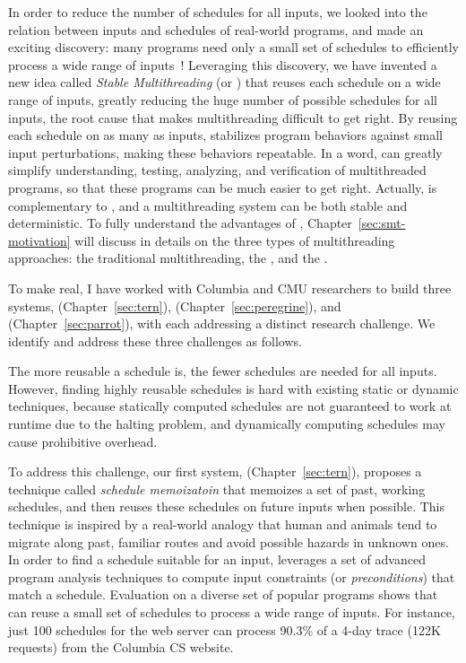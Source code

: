 In order to reduce the number of schedules for all inputs, we looked into the
relation between inputs and schedules of real-world programs, and made an
exciting discovery: many programs need only a small set of schedules to
efficiently process a wide range of inputs~\cite{smt:cacm}! Leveraging this
discovery, we have invented a new idea called \emph{Stable Multithreading} (or 
\emph{\smt}) that reuses each schedule on a wide range of inputs, greatly 
reducing the huge number of possible schedules for all inputs, the root 
cause that makes multithreading difficult to get right. By reusing each 
schedule on as many as inputs, \smt stabilizes program behaviors 
against small input perturbations, making these behaviors repeatable. In a 
word, \smt can greatly simplify understanding, testing, analyzing, and 
verification of multithreaded programs, so that these programs can be much 
easier to get right. Actually, \smt is complementary to \dmt, and a 
multithreading system can be both stable and deterministic. To fully understand 
the advantages of \smt, Chapter~\ref{sec:smt-motivation} will discuss in 
details on the three types of multithreading approaches: the traditional 
multithreading, the \dmt, and the \smt.


To make \smt real, I have worked with Columbia and CMU researchers to build
three \smt systems, \tern (Chapter~\ref{sec:tern}), \peregrine 
(Chapter~\ref{sec:peregrine}), and \parrot (Chapter~\ref{sec:parrot}), with 
each addressing a distinct research challenge. We identify and address these 
three challenges as follows.

 The more reusable a schedule is, the fewer schedules are needed for 
all inputs.
However, finding highly reusable schedules is hard with existing static or
dynamic techniques, because statically computed schedules are not guaranteed to
work at runtime due to the halting problem, and dynamically computing schedules
may cause prohibitive overhead.

To address this challenge, our first \smt system, 
\tern (Chapter~\ref{sec:tern}), proposes a technique 
called \emph{schedule memoizatoin} that memoizes a set of past, working 
schedules, and then reuses these schedules on future inputs when possible. This 
technique is inspired by a real-world analogy that human and animals tend to 
migrate along past, familiar routes and avoid possible hazards in unknown ones. 
In order to find a schedule suitable for an input, \tern leverages a set of 
advanced program analysis techniques to compute input constraints (or 
\emph{preconditions}) that match a schedule. Evaluation on a diverse set of 
popular programs shows that \tern can reuse a small set of schedules to process 
a wide range of inputs. For instance, just 100 schedules for the \apache web 
server can process 90.3\% of a 4-day trace (122K requests) from the Columbia CS 
website.

